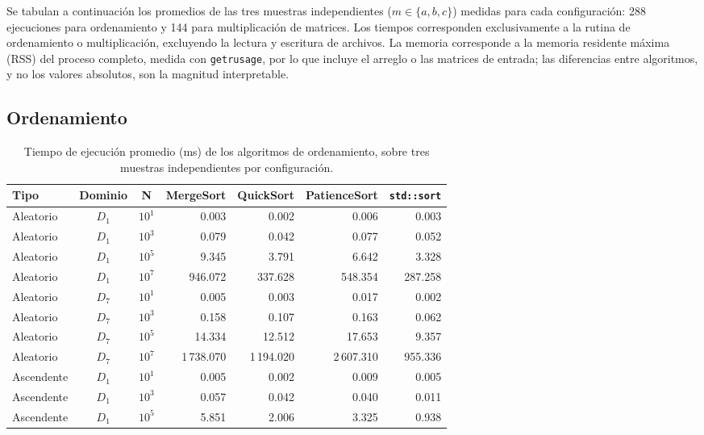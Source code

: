 Se tabulan a continuación los promedios de las tres muestras independientes ($m \in \{a,b,c\}$) medidas para cada configuración: 288 ejecuciones para ordenamiento y 144 para multiplicación de matrices. Los tiempos corresponden exclusivamente a la rutina de ordenamiento o multiplicación, excluyendo la lectura y escritura de archivos. La memoria corresponde a la memoria residente máxima (RSS) del proceso completo, medida con \texttt{getrusage}, por lo que incluye el arreglo o las matrices de entrada; las diferencias entre algoritmos, y no los valores absolutos, son la magnitud interpretable.

\subsection{Ordenamiento}

\begin{table}[htbp]
\centering
\caption{Tiempo de ejecución promedio (ms) de los algoritmos de ordenamiento, sobre tres muestras independientes por configuración.}
\vspace{0.2cm}
\small
\begin{tabular}{|l|c|c|r|r|r|r|}
\hline
\textbf{Tipo} & \textbf{Dominio} & \textbf{N} & \textbf{MergeSort} & \textbf{QuickSort} & \textbf{PatienceSort} & \textbf{\texttt{std::sort}} \\ \hline
Aleatorio & $D_{1}$ & $10^{1}$ & 0.003 & 0.002 & 0.006 & 0.003 \\ \hline
Aleatorio & $D_{1}$ & $10^{3}$ & 0.079 & 0.042 & 0.077 & 0.052 \\ \hline
Aleatorio & $D_{1}$ & $10^{5}$ & 9.345 & 3.791 & 6.642 & 3.328 \\ \hline
Aleatorio & $D_{1}$ & $10^{7}$ & 946.072 & 337.628 & 548.354 & 287.258 \\ \hline
Aleatorio & $D_{7}$ & $10^{1}$ & 0.005 & 0.003 & 0.017 & 0.002 \\ \hline
Aleatorio & $D_{7}$ & $10^{3}$ & 0.158 & 0.107 & 0.163 & 0.062 \\ \hline
Aleatorio & $D_{7}$ & $10^{5}$ & 14.334 & 12.512 & 17.653 & 9.357 \\ \hline
Aleatorio & $D_{7}$ & $10^{7}$ & 1\,738.070 & 1\,194.020 & 2\,607.310 & 955.336 \\ \hline
Ascendente & $D_{1}$ & $10^{1}$ & 0.005 & 0.002 & 0.009 & 0.005 \\ \hline
Ascendente & $D_{1}$ & $10^{3}$ & 0.057 & 0.042 & 0.040 & 0.011 \\ \hline
Ascendente & $D_{1}$ & $10^{5}$ & 5.851 & 2.006 & 3.325 & 0.938 \\ \hline

\end{tabular}
\end{table}
